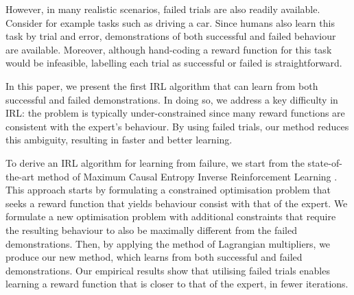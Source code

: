 \documentclass[conference]{IEEEtran}
\begin{document}
%


However, in many realistic scenarios, failed trials are also readily available.  Consider for example tasks such as driving a car.  Since humans also learn this task by trial and error, demonstrations of both successful and failed behaviour are available. Moreover, although hand-coding a reward function for this task would be infeasible, labelling each trial as successful or failed is straightforward.

In this paper, we present the first IRL algorithm that can learn from both successful and failed demonstrations.  In doing so, we address a key difficulty in IRL: the problem is typically under-constrained since many reward functions are consistent with the expert's behaviour.  By using failed trials, our method reduces this ambiguity, resulting in faster and better learning.

To derive an IRL algorithm for learning from failure, we start from the state-of-the-art method of Maximum Causal Entropy Inverse Reinforcement Learning \cite{ziebart2008maximum}.  This approach starts by formulating a constrained optimisation problem that seeks a reward function that yields behaviour consist with that of the expert.  We formulate a new optimisation problem with additional constraints that require the resulting behaviour to also be maximally different from the failed demonstrations. Then, by applying the method of Lagrangian multipliers, we produce our new method, which learns from both successful and failed demonstrations.
	Our empirical results show that utilising failed trials enables learning  a reward function that is closer to that of the expert, in fewer iterations.



\end{document}
